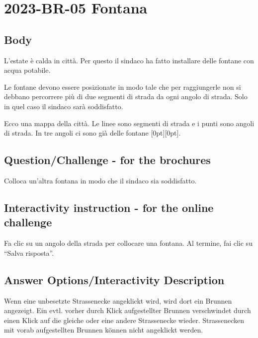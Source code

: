 \documentclass[a4paper,11pt]{report}
\newcommand{\taskGraphicsFolder}{..}
\begin{document}
\section*{\centering{} 2023-BR-05 Fontana}


\subsection*{Body}

L’estate è calda in città. Per questo il sindaco ha fatto installare delle fontane con acqua potabile.

Le fontane devono essere posizionate in modo tale che per raggiungerle non si debbano percorrere più di due segmenti di strada da ogni angolo di strada. Solo in quel caso il sindaco sarà soddisfatto.

Ecco una mappa della città. Le linee sono segmenti di strada e i punti sono angoli di strada.
In tre angoli ci sono già delle fontane \raisebox{-0.5ex}[0pt][0pt]{}.

{\centering%
\par}

{\em


\subsection*{Question/Challenge - for the brochures}

Colloca un’altra fontana in modo che il sindaco sia soddisfatto.

}


\subsection*{Interactivity instruction - for the online challenge}

Fa clic su un angolo della strada per collocare una fontana. Al termine, fai clic su \enquote{Salva risposta}.

\begingroup
\renewcommand{\arraystretch}{1.5}
\subsection*{Answer Options/Interactivity Description}

Wenn eine unbesetzte Strassenecke angeklickt wird, wird dort ein Brunnen angezeigt. Ein evtl. vorher durch Klick aufgestellter Brunnen verschwindet durch einen Klick auf die gleiche oder eine andere Strassenecke wieder. Strassenecken mit vorab aufgestellten Brunnen können nicht angeklickt werden.
\end{document}
